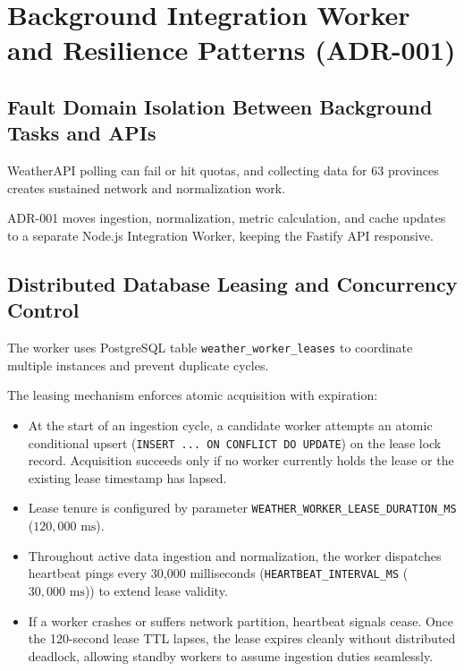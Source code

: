 \section{Background Integration Worker and Resilience Patterns (ADR-001)}
\label{sec:worker_resilience_adr001}

\subsection{Fault Domain Isolation Between Background Tasks and APIs}
WeatherAPI polling can fail or hit quotas, and collecting data for 63 provinces creates sustained network and normalization work.

ADR-001 moves ingestion, normalization, metric calculation, and cache updates to a separate Node.js Integration Worker, keeping the Fastify API responsive.

\subsection{Distributed Database Leasing and Concurrency Control}
The worker uses PostgreSQL table \texttt{weather\_worker\_leases} to coordinate multiple instances and prevent duplicate cycles.

The leasing mechanism enforces atomic acquisition with expiration:
\begin{itemize}
    \item[-] At the start of an ingestion cycle, a candidate worker attempts an atomic conditional upsert (\texttt{INSERT ... ON CONFLICT DO UPDATE}) on the lease lock record. Acquisition succeeds only if no worker currently holds the lease or the existing lease timestamp has lapsed.
    \item[-] Lease tenure is configured by parameter \texttt{WEATHER\_}\allowbreak\texttt{WORKER\_}\allowbreak\texttt{LEASE\_}\allowbreak\texttt{DURATION\_MS} ($120,000\text{ ms}$).
    \item[-] Throughout active data ingestion and normalization, the worker dispatches heartbeat pings every 30,000 milliseconds (\texttt{HEARTBEAT\_INTERVAL\_MS} ($30,000\text{ ms}$)) to extend lease validity.
    \item[-] If a worker crashes or suffers network partition, heartbeat signals cease. Once the 120-second lease TTL lapses, the lease expires cleanly without distributed deadlock, allowing standby workers to assume ingestion duties seamlessly.
\end{itemize}

